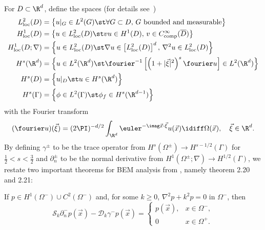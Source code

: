 For $D\subset\R^d$, define the spaces (for details see~\cite{Chandler_Wilde2012nab})
\begin{align*}
	L_{\mathrm{loc}}^2(D) &= \left\{u|_G\in L^2(G)\st \forall G\subset D,\, G \text{ bounded and measurable}\right\}\\
	H_{\mathrm{loc}}^1(D) &= \left\{u\in L_{\mathrm{loc}}^2(D)\st vu\in H^1(D),\, v\in C_{\mathrm{comp}}^\infty(\overline{D})\right\}\\
	H_{\mathrm{loc}}^1(D;\nabla) &= \left\{u\in L_{\mathrm{loc}}^2(D)\st \nabla u\in \left[L_{\mathrm{loc}}^2(D)\right]^d,\, \nabla^2 u\in L_{\mathrm{loc}}^2(D)\right\}\\
	H^s(\R^d) &= \left\{u\in L^2(\R^d)\st \fourier^{-1}\left[\left(1+|\vec{\xi}|^2\right)^s\fourier u\right]\in L^2(\R^d)\right\}\\
	H^s(D) &= \left\{u|_D\st u\in H^s(\R^d)\right\}\\
	H^s(\Gamma) &= \left\{\phi\in L^2(\Gamma)\st \phi_f\in H^s(\R^{d-1})\right\}
\end{align*}
with the Fourier transform
\begin{equation*}
	(\fourier u)(\vec{\xi}) = (2\PI)^{-d/2}\int_{\R^d}\euler^{-\imag \vec{x}\cdot \vec{\xi}}u(\vec{x})\idiff\Omega(\vec{x}),\quad\vec{\xi}\in\R^d.
\end{equation*}
By defining $\gamma^\pm$ to be the trace operator from $H^s(\Omega^\pm)\to H^{s-1/2}(\Gamma)$ for $\frac{1}{2}<s<\frac{3}{2}$ and $\partial_n^\pm$ to be the normal derivative from $H^1(\Omega^\pm; \nabla)\to H^{1/2}(\Gamma)$, we restate two important theorems for BEM analysis from \cite{Chandler_Wilde2012nab}, namely theorem 2.20 and 2.21:
\begin{theorem}\label{Thm:InteriorProblem}
	If $p\in H^1(\Omega^-)\cup C^2(\Omega^-)$ and, for some $k\geq 0$, $\nabla^2 p + k^2 p = 0$ in $\Omega^-$, then
	\begin{equation*}
		\mathcal{S}_k\partial_n^- p(\vec{x}) - \mathcal{D}_k\gamma^- p(\vec{x}) = \begin{cases} p(\vec{x}), & x\in\Omega^-,\\
		0 & x\in\Omega^+.\end{cases}
\end{equation*}	 
\end{theorem}
